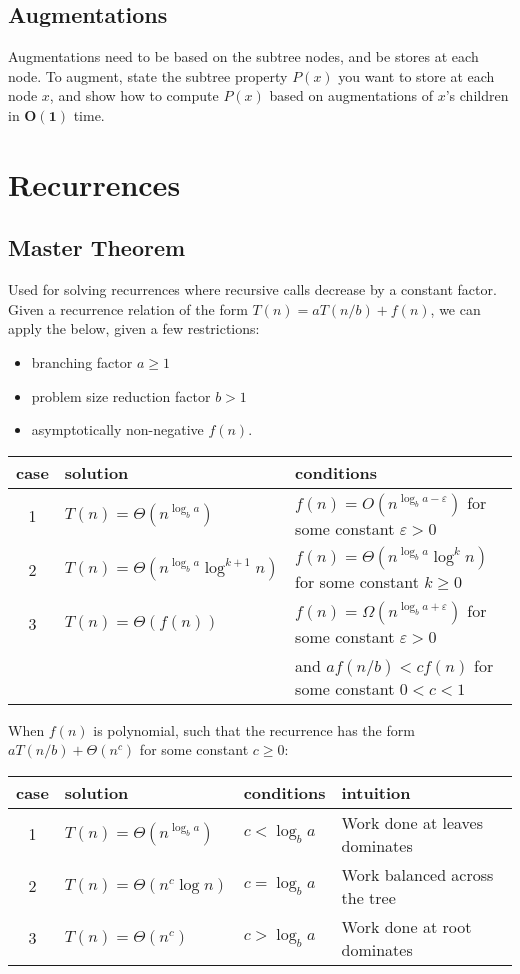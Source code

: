 \documentclass{article}
\begin{document}
\subsection{Augmentations}
Augmentations need to be based on the subtree nodes, and be stores at each node. To augment, state the subtree property $P(x)$ you want to store at each node $x$, and show how to compute $P(x)$ based on augmentations of $x$'s children in $\mathbf{O(1)}$ time. 

\section{Recurrences}
\subsection{Master Theorem}
Used for solving recurrences where recursive calls decrease by a constant factor. Given a recurrence relation of the form $T(n) = aT(n/b)+f(n)$, we can apply the below, given a few restrictions:
\begin{itemize}[noitemsep,topsep=1pt]
    \item branching factor $a \geq 1$
    \item problem size reduction factor $b > 1$
    \item asymptotically non-negative $f(n)$.
\end{itemize}
\begin{center}
    \begin{tabular}{c|l|l} 
        case & solution & conditions \\
        \hline 1 & $T(n)=\Theta\left(n^{\log _{b} a}\right)$ & $f(n)=O\left(n^{\log _{b} a-\varepsilon}\right)$ for some constant $\varepsilon>0$ \\
        \hline 2 & $T(n)=\Theta\left(n^{\log _{b} a} \log ^{k+1} n\right)$ & $f(n)=\Theta\left(n^{\log _{b} a} \log ^{k} n\right)$ for some constant $k \geq 0$ \\
        \hline 3 & $T(n)=\Theta(f(n))$ & $f(n)=\Omega\left(n^{\log _{b} a+\varepsilon}\right)$ for some constant $\varepsilon>0$ \\
        & & and $a f(n / b)<c f(n)$ for some constant $0<c<1$
    \end{tabular}
\end{center}

When $f(n)$ is polynomial, such that the recurrence has the form $aT(n/b) + \Theta(n^c)$ for some constant $c \geq 0$:

\begin{center}
    \begin{tabular}{c|l|l|l} 
        case & solution & conditions & intuition \\
        \hline 1 & $T(n)=\Theta\left(n^{\log _{b} a}\right)$ & $c<\log _{b} a$ & Work done at leaves dominates \\
        \hline 2 & $T(n)=\Theta\left(n^{c} \log n\right)$ & $c=\log _{b} a$ & Work balanced across the tree \\
        \hline 3 & $T(n)=\Theta\left(n^{c}\right)$ & $c>\log _{b} a$ & Work done at root dominates
    \end{tabular}
\end{center}
\end{document}

